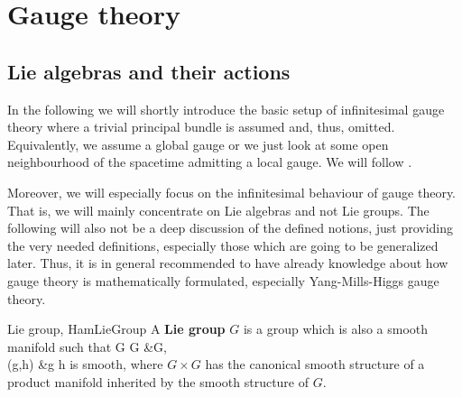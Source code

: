 \chapter{Gauge theory}
\label{ClassicGaugeTheory}
\section{Lie algebras and their actions}\label{LieAlgebraActions}

In the following we will shortly introduce the basic setup of infinitesimal gauge theory where a trivial principal bundle is assumed and, thus, omitted. Equivalently, we assume a global gauge or we just look at some open neighbourhood of the spacetime admitting a local gauge. We will follow \cite{hamilton}.

Moreover, we will especially focus on the infinitesimal behaviour of gauge theory. That is, we will mainly concentrate on Lie algebras and not Lie groups. The following will also not be a deep discussion of the defined notions, just providing the very needed definitions, especially those which are going to be generalized later. Thus, it is in general recommended to have already knowledge about how gauge theory is mathematically formulated, especially Yang-Mills-Higgs gauge theory.

\begin{definitions}{Lie group, \cite[Definition 1.1.4; page 6]{hamilton}}{HamLieGroup}
A \textbf{Lie group} $G$ is a group which is also a smooth manifold such that 
\bas
G \times G &\to G, \\
(g,h) &\mapsto g \cdot h
\eas
is smooth, where $G \times G$ has the canonical smooth structure of a product manifold inherited by the smooth structure of $G$.
\end{definitions}

